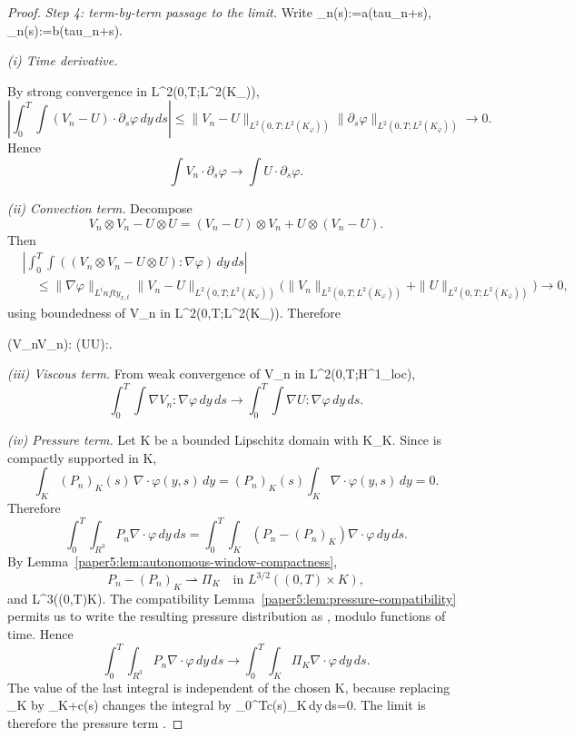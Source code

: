 \documentclass[11pt]{amsart}
\def\({}%
\def\){}%
\def\mathrm#1{#1}%
\def\mathbb#1{#1}%
\def\tau{tau}%
\def\infty{infty}%
\theoremstyle{plain}
\theoremstyle{definition}
\theoremstyle{remark}
\begin{document}
\begin{proof}
\emph{Step 4: term-by-term passage to the limit.}
Write \(\alpha_n(s):=a(\tau_n+s)\), \(\beta_n(s):=b(\tau_n+s)\).

\medskip
\noindent\textit{(i) Time derivative.}

By strong convergence in \(L^2(0,T;L^2(K_\varphi))\),
\[
  \left|\int_0^T\!\int (V_n-U)\cdot\partial_s\varphi
  \,dy\,ds\right|
  \le
  \|V_n-U\|_{L^2(0,T;L^2(K_\varphi))}
  \|\partial_s\varphi\|_{L^2(0,T;L^2(K_\varphi))}
  \to0.
\]
Hence
\[\int V_n\cdot\partial_s\varphi\to\int U\cdot\partial_s\varphi.
\]

\medskip
\noindent\textit{(ii) Convection term.}
Decompose
\[
  V_n\otimes V_n-U\otimes U=(V_n-U)\otimes V_n+U\otimes(V_n-U).
\]
Then
\[
\begin{aligned}
&\left|\int_0^T\!\int((V_n\otimes V_n-U\otimes U):\nabla\varphi)
  \,dy\,ds\right|\\
&\quad\le
  \|\nabla\varphi\|_{L^\infty_{x,t}}
  \|V_n-U\|_{L^2(0,T;L^2(K_\varphi))}
  \bigl(\|V_n\|_{L^2(0,T;L^2(K_\varphi))}
  +\|U\|_{L^2(0,T;L^2(K_\varphi))}\bigr)
  \to0,
\end{aligned}
\]
using boundedness of \(V_n\) in \(L^2(0,T;L^2(K_\varphi))\). Therefore
\(
  \int(V_n\otimes V_n):\nabla\varphi
  \to\int(U\otimes U):\nabla\varphi.
\)

\medskip
\noindent\textit{(iii) Viscous term.}
From weak convergence of \(V_n\) in \(L^2(0,T;H^1_{\mathrm{loc}})\),
\[
  \int_0^T\!\int\nabla V_n:\nabla\varphi
  \,dy\,ds
  \to
  \int_0^T\!\int\nabla U:\nabla\varphi
  \,dy\,ds.
\]

\medskip
\noindent\textit{(iv) Pressure term.}
Let \(K\) be a bounded Lipschitz domain with \(K_\varphi\Subset K\).  Since
\(\varphi\) is compactly supported in \(K\),
\[
  \int_K (P_n)_K(s)\,\nabla\cdot\varphi(y,s)\,dy
  =
  (P_n)_K(s)\int_K\nabla\cdot\varphi(y,s)\,dy=0.
\]
Therefore
\[
  \int_0^T\!\int_{\mathbb R^3}P_n\nabla\cdot\varphi\,dy\,ds
  =
  \int_0^T\!\int_K(P_n-(P_n)_K)\nabla\cdot\varphi\,dy\,ds.
\]
By Lemma~\ref{paper5:lem:autonomous-window-compactness},
\[
  P_n-(P_n)_K\rightharpoonup\Pi_K
  \quad\text{in }L^{3/2}((0,T)\times K),
\]
and \(\nabla\cdot\varphi\in L^3((0,T)\times K)\).  The compatibility
Lemma~\ref{paper5:lem:pressure-compatibility} permits us to write the resulting pressure distribution
as \(\Pi\), modulo functions of time.  Hence
\[
  \int_0^T\!\int_{\mathbb R^3}P_n\nabla\cdot\varphi\,dy\,ds
  \to
  \int_0^T\!\int_K\Pi_K\nabla\cdot\varphi\,dy\,ds.
\]
The value of the last integral is independent of the chosen \(K\), because replacing
\(\Pi_K\) by \(\Pi_K+c(s)\) changes the integral by
\(\int_0^Tc(s)\int_K\nabla\cdot\varphi\,dy\,ds=0\).  The limit is therefore the pressure term
\(\int\Pi\nabla\cdot\varphi\).


\end{proof}
\end{document}
